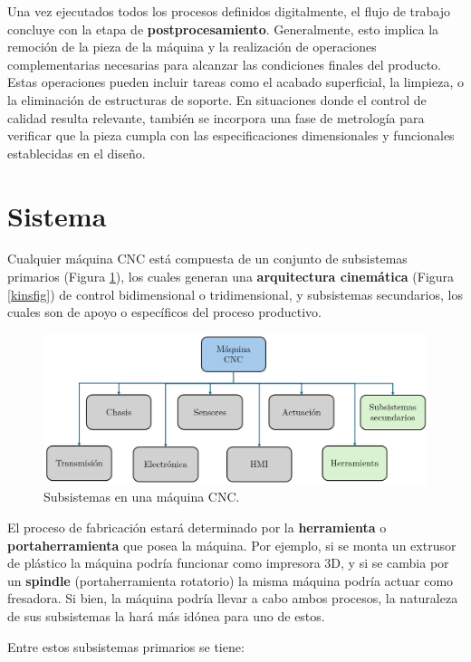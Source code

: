 Una vez ejecutados todos los procesos definidos digitalmente, el flujo de trabajo concluye con la etapa de \textbf{postprocesamiento}. Generalmente, esto implica la remoción de la pieza de la máquina y la realización de operaciones complementarias necesarias para alcanzar las condiciones finales del producto. Estas operaciones pueden incluir tareas como el acabado superficial, la limpieza, o la eliminación de estructuras de soporte. En situaciones donde el control de calidad resulta relevante, también se incorpora una fase de metrología para verificar que la pieza cumpla con las especificaciones dimensionales y funcionales establecidas en el diseño.

\section{Sistema}

Cualquier máquina CNC está compuesta de un conjunto de subsistemas primarios (Figura \ref{cncsis}), los cuales generan una \textbf{arquitectura cinemática} (Figura \ref{kinsfig}) de control bidimensional o tridimensional, y subsistemas secundarios, los cuales son de apoyo o específicos del proceso productivo.

\begin{figure}[h!]
    \centering
    \includegraphics[width=0.9\linewidth]{imgs/cnc.png}
    \caption{Subsistemas en una máquina CNC.}
    \label{cncsis}
\end{figure}

El proceso de fabricación estará determinado por la \textbf{herramienta} o \textbf{portaherramienta} que posea la máquina. Por ejemplo, si se monta un extrusor de plástico la máquina podría funcionar como impresora 3D, y si se cambia por un \textbf{spindle} (portaherramienta rotatorio) la misma máquina podría actuar como fresadora. Si bien, la máquina podría llevar a cabo ambos procesos, la naturaleza de sus subsistemas la hará más idónea para uno de estos.

Entre estos subsistemas primarios se tiene:


